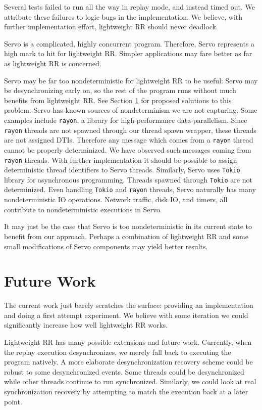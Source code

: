 \documentclass{article}
\begin{document}
Several tests failed to run all the way in replay mode, and instead timed out. We attribute
these failures to logic bugs in the implementation. We believe, with further implementation
effort, lightweight RR should never deadlock.

Servo is a complicated, highly concurrent program. Therefore, Servo represents a high
mark to hit for lightweight RR. Simpler applications may fare better as far as lightweight
RR is concerned.

Servo may be far too nondeterministic
for lightweight RR to be useful: Servo may be desynchronizing early on, so the rest of
the program runs without much benefits from lightweight RR.
See Section \ref{sec:future_work} for proposed solutions to this
problem. Servo has known sources of nondeterminism we are not capturing. Some examples
include \texttt{rayon}, a library for high-performance data-parallelism. Since \texttt{rayon} threads are
not spawned through our thread spawn wrapper, these threads are not assigned DTIs. Therefore any message which comes from a \texttt{rayon} thread cannot be properly determinized.
We have observed such messages coming from \texttt{rayon} threads.
With further implementation it should be possible to assign deterministic thread
identifiers to Servo threads. Similarly, Servo uses \texttt{Tokio} library for asynchronous programming. Threads spawned through \texttt{Tokio} are not determinized.
Even handling \texttt{Tokio} and \texttt{rayon} threads, Servo naturally has many nondeterministic IO operations. Network traffic, disk IO, and timers, all contribute to nondeterministic executions in Servo.

It may just be the case that Servo is too nondeterministic in its current state to benefit
from our approach. Perhaps a combination of lightweight RR and some small modifications
of Servo components may yield better results.

\section{Future Work}
\label{sec:future_work}
The current work just barely scratches the surface: providing an implementation
and doing a first attempt experiment. We believe with some iteration we could significantly
increase how well lightweight RR works.

Lightweight RR has many possible extensions and future work. Currently, when the replay
execution desynchronizes, we merely fall back to executing the program natively. A more
elaborate desynchronization recovery scheme could be robust to some desynchronized
events. Some threads could be desynchronized while other threads continue to run
synchronized. Similarly, we could look at real synchronization recovery by attempting
to match the execution back at a later point.
\end{document}
